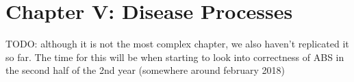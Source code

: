 \section{Chapter V: Disease Processes}
TODO: although it is not the most complex chapter, we also haven't replicated it so far. The time for this will be when starting to look into correctness of ABS in the second half of the 2nd year (somewhere around february 2018)